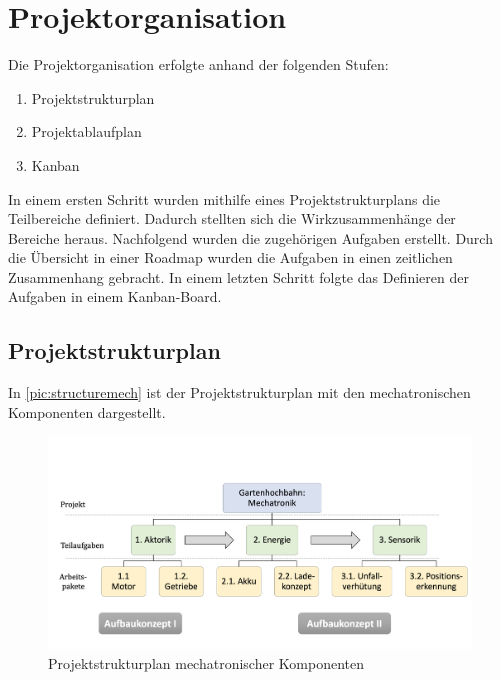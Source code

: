 \section{Projektorganisation}
\label{sec:projektorganisation}
Die Projektorganisation erfolgte anhand der folgenden Stufen: 

\begin{enumerate}
	\item Projektstrukturplan %
	\item Projektablaufplan 
	\item Kanban
	
\end{enumerate}

In einem ersten Schritt wurden mithilfe eines Projektstrukturplans die Teilbereiche definiert. Dadurch stellten sich die Wirkzusammenhänge der Bereiche heraus. Nachfolgend wurden die zugehörigen Aufgaben erstellt. Durch die Übersicht in einer Roadmap wurden die Aufgaben in einen zeitlichen Zusammenhang gebracht. 
In einem letzten Schritt folgte das Definieren der Aufgaben in einem Kanban-Board. 


\newpage
\subsection{Projektstrukturplan}
In \autoref{pic:structuremech} ist der  Projektstrukturplan mit den mechatronischen Komponenten dargestellt. 

\begin{figure}[h]
	\begin{center}
		\includegraphics[width=17cm]{structureMech.png}
		\caption{Projektstrukturplan mechatronischer Komponenten}
		\label{pic:structuremech}
	\end{center}
\end{figure}

